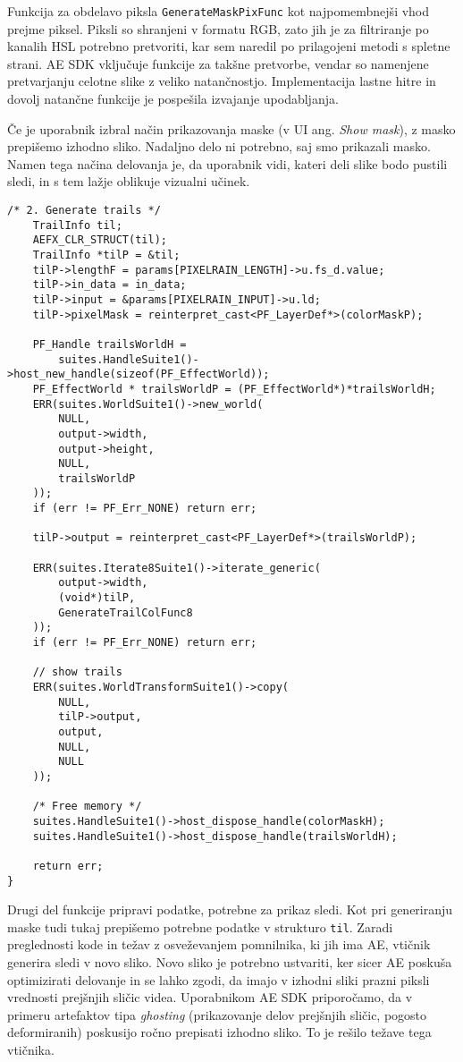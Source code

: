 \documentclass[a4paper, 12pt]{book}
\begin{document}
Funkcija za obdelavo piksla \texttt{GenerateMaskPixFunc} kot najpomembnejši vhod prejme piksel.
Piksli so shranjeni v formatu RGB, zato jih je za filtriranje po kanalih HSL potrebno pretvoriti, kar sem naredil po prilagojeni metodi s spletne strani\cite{rgbhsl}.
AE SDK vključuje funkcije za takšne pretvorbe, vendar so namenjene pretvarjanju celotne slike z veliko natančnostjo.
Implementacija lastne hitre in dovolj natančne funkcije je pospešila izvajanje upodabljanja.

Če je uporabnik izbral način prikazovanja maske (v UI ang. {\it Show mask}), z masko prepišemo izhodno sliko.
Nadaljno delo ni potrebno, saj smo prikazali masko.
Namen tega načina delovanja je, da uporabnik vidi, kateri deli slike bodo pustili sledi, in s tem lažje oblikuje vizualni učinek.

\begin{verbatim}
/* 2. Generate trails */
    TrailInfo til;
    AEFX_CLR_STRUCT(til);
    TrailInfo *tilP = &til;
    tilP->lengthF = params[PIXELRAIN_LENGTH]->u.fs_d.value;
    tilP->in_data = in_data;
    tilP->input = &params[PIXELRAIN_INPUT]->u.ld;
    tilP->pixelMask = reinterpret_cast<PF_LayerDef*>(colorMaskP);

    PF_Handle trailsWorldH = 
        suites.HandleSuite1()->host_new_handle(sizeof(PF_EffectWorld));
    PF_EffectWorld * trailsWorldP = (PF_EffectWorld*)*trailsWorldH;
    ERR(suites.WorldSuite1()->new_world(
        NULL,
        output->width,
        output->height,
        NULL,
        trailsWorldP
    ));
    if (err != PF_Err_NONE) return err;

    tilP->output = reinterpret_cast<PF_LayerDef*>(trailsWorldP);

    ERR(suites.Iterate8Suite1()->iterate_generic(
        output->width,
        (void*)tilP,
        GenerateTrailColFunc8
    ));
    if (err != PF_Err_NONE) return err;
    
    // show trails
    ERR(suites.WorldTransformSuite1()->copy(
        NULL,
        tilP->output,
        output,
        NULL,
        NULL
    ));

    /* Free memory */
    suites.HandleSuite1()->host_dispose_handle(colorMaskH);
    suites.HandleSuite1()->host_dispose_handle(trailsWorldH);
    
    return err;
}
\end{verbatim}

Drugi del funkcije pripravi podatke, potrebne za prikaz sledi.
Kot pri generiranju maske tudi tukaj prepišemo potrebne podatke v strukturo \texttt{til}.
Zaradi preglednosti kode in težav z osveževanjem pomnilnika, ki jih ima AE, vtičnik generira sledi v novo sliko.
Novo sliko je potrebno ustvariti, ker sicer AE poskuša optimizirati delovanje in se lahko zgodi, da imajo v izhodni sliki prazni piksli vrednosti prejšnjih sličic videa.
Uporabnikom AE SDK priporočamo, da v primeru artefaktov tipa {\it ghosting} (prikazovanje delov prejšnjih sličic, pogosto deformiranih) poskusijo ročno prepisati izhodno sliko.
To je rešilo težave tega vtičnika.
\end{document}

